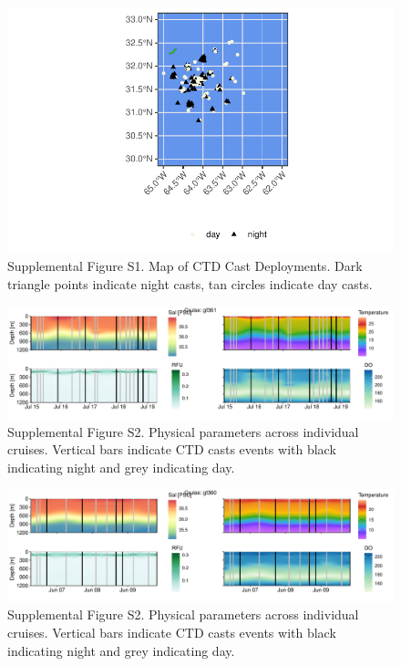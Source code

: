 \documentclass[
]{article}
\begin{document}
\begin{figure}

{\centering \includegraphics{index_files/figure-pdf/unnamed-chunk-17-1.pdf}

}

\caption{Supplemental Figure S1. Map of CTD Cast Deployments. Dark
triangle points indicate night casts, tan circles indicate day casts.}

\end{figure}

\begin{figure}

{\centering \includegraphics[width=1\textwidth,height=\textheight]{index_files/figure-pdf/unnamed-chunk-19-1.pdf}

}

\caption{Supplemental Figure S2. Physical parameters across individual
cruises. Vertical bars indicate CTD casts events with black indicating
night and grey indicating day.}

\end{figure}

\begin{figure}

{\centering \includegraphics[width=1\textwidth,height=\textheight]{index_files/figure-pdf/unnamed-chunk-19-2.pdf}

}

\caption{Supplemental Figure S2. Physical parameters across individual
cruises. Vertical bars indicate CTD casts events with black indicating
night and grey indicating day.}

\end{figure}
\end{document}
